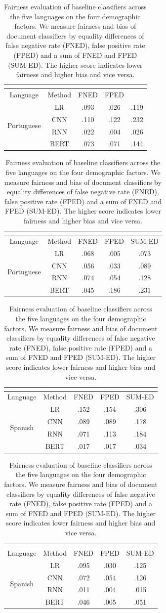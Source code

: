 \begin{table}[htp]
\begin{tabular}{cc|ccc}
\multicolumn{5}{c}{} \\\hline\hline
Language & Method & FNED & FPED \\\hline
\multirow{4}{*}{Portuguese} & LR & .093 & .026 & .119\\
 & CNN  & .110 & .122 & .232 \\
 & RNN  & .022 & .004 & .026 \\
 & BERT & .073 & .071 & .144
\end{tabular}
\quad
\begin{tabular}{cc|ccc}
\multicolumn{5}{c}{} \\\hline\hline
Language & Method & FNED & FPED & SUM-ED \\\hline
\multirow{4}{*}{Portuguese} & LR  & .068 & .005 & .073 \\
 & CNN  & .056 & .033 & .089 \\
 & RNN  & .074 & .054 & .128 \\
 & BERT & .045 & .186 & .231
\end{tabular}

\begin{tabular}{cc|ccc}
\multicolumn{5}{c}{} \\\hline\hline
Language & Method & FNED & FPED & SUM-ED \\\hline
\multirow{4}{*}{Spanish} & LR & .152 & .154 & .306\\
 & CNN  & .089 & .089 & .178 \\
 & RNN  & .071 & .113 & .184 \\
 & BERT & .017 & .017 & .034
\end{tabular}
\quad
\begin{tabular}{cc|ccc}
\multicolumn{5}{c}{} \\\hline\hline
Language & Method & FNED & FPED & SUM-ED \\\hline
\multirow{4}{*}{Spanish} & LR & .095 & .030 & .125 \\
 & CNN  & .072 & .054 & .126 \\
 & RNN  & .011 & .004 & .015 \\
 & BERT & .046 & .005 & .051
\end{tabular}
\caption{Fairness evaluation of baseline classifiers across the five languages on the four demographic factors. We measure fairness and bias of document classifiers by equality differences of false negative rate (FNED), false positive rate (FPED) and a sum of FNED and FPED (SUM-ED). The higher score indicates lower fairness and higher bias and vice versa.}
\label{chap5:tab:fairness}
\end{table}

